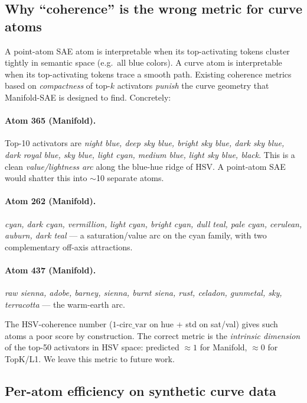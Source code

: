 \documentclass[10pt,twocolumn]{article}
\begin{document}
\subsection{Why ``coherence'' is the wrong metric for curve atoms}

A point-atom SAE atom is interpretable when its top-activating tokens cluster
tightly in semantic space (e.g.\ all blue colors). A curve atom is interpretable
when its top-activating tokens trace a smooth path. Existing coherence metrics
based on \emph{compactness} of top-$k$ activators \emph{punish} the curve
geometry that Manifold-SAE is designed to find. Concretely:

\paragraph{Atom 365 (Manifold).} Top-10 activators are
\textit{night blue, deep sky blue, bright sky blue, dark sky blue, dark royal
blue, sky blue, light cyan, medium blue, light sky blue, black}. This is a
clean \emph{value/lightness arc} along the blue-hue ridge of HSV. A point-atom
SAE would shatter this into $\sim$10 separate atoms.

\paragraph{Atom 262 (Manifold).} \textit{cyan, dark cyan, vermillion, light cyan,
bright cyan, dull teal, pale cyan, cerulean, auburn, dark teal} --- a
saturation/value arc on the cyan family, with two complementary off-axis
attractions.

\paragraph{Atom 437 (Manifold).} \textit{raw sienna, adobe, barney, sienna,
burnt siena, rust, celadon, gunmetal, sky, terracotta} --- the warm-earth arc.

The HSV-coherence number ($\textrm{1{-}circ\_var}$ on hue + std on sat/val)
gives such atoms a poor score by construction. The correct metric is the
\emph{intrinsic dimension} of the top-50 activators in HSV space: predicted
$\approx 1$ for Manifold, $\approx 0$ for TopK/L1. We leave this metric to
future work.

\subsection{Per-atom efficiency on synthetic curve data}
\end{document}
